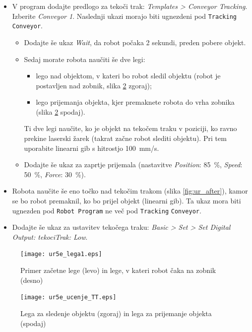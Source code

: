 \begin{mdframed}[backgroundcolor=yellow!20, shadow=true,roundcorner=8pt]
\begin{itemize}
  \item V program dodajte predlogo za tekoči trak:  \emph{Templates > Conveyor Tracking}. Izberite \emph{Conveyor 1}. Naslednji ukazi morajo biti ugnezdeni pod \verb"Tracking Conveyor".
  \begin{itemize}
      \item Dodajte še ukaz \emph{Wait}, da robot počaka 2 sekundi, preden pobere objekt.
      \item Sedaj morate robota naučiti še dve legi:
      \begin{itemize}
        \item lego nad objektom, v kateri bo robot sledil objektu (robot je postavljen nad zobnik, slika \ref{fig:ur_ucenje_TT} zgoraj);
        \item lego prijemanja objekta, kjer premaknete robota do vrha zobnika (slika \ref{fig:ur_ucenje_TT} spodaj).
      \end{itemize}
      Ti dve legi naučite, ko je objekt na tekočem traku v poziciji, ko ravno prekine laserski žarek (takrat začne robot slediti objektu). Pri tem uporabite linearni gib s hitrostjo 100~mm/s.
      \item Dodajte še ukaz za zaprtje prijemala (nastavitve \emph{Position}: 85~\%, \emph{Speed}: 50~\%, \emph{Force}: 30~\%).
  \end{itemize}
  \item Robota naučite še eno točko nad tekočim trakom (slika \ref{fig:ur_after}), kamor se bo robot premaknil, ko bo prijel objekt (linearni gib). Ta ukaz mora biti ugnezden pod \verb"Robot Program" ne več pod \verb"Tracking" \verb"Conveyor".
  \item Dodajte še ukaz za ustavitev tekočega traku: \emph{Basic > Set > Set Digital Output: tekociTrak: Low}.
 \end{itemize}
\end{mdframed}

   \begin{figure}[!htb]
\centering
 \texttt{[image: ur5e\_lega1.eps]}
\caption{Primer začetne lege (levo) in lege, v kateri robot čaka na zobnik (desno)}
\label{fig:ur_lega1}
\end{figure}

   \begin{figure}[!htb]
\centering
 \texttt{[image: ur5e\_ucenje\_TT.eps]}
\caption{Lega za sledenje objektu (zgoraj) in lega za prijemanje objekta (spodaj)}
\label{fig:ur_ucenje_TT}
\end{figure}



